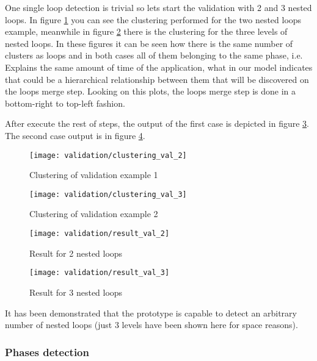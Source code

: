 One single loop detection is trivial so lets start the validation with 2 and 3 nested
loops. In figure \ref{fig:clustering_val_2} you can see the clustering performed
for the two nested loops example, meanwhile in figure
\ref{fig:clustering_val_3} there is the clustering for the three levels of
nested loops. In these figures it can be seen how there is the
same number of clusters as loops and in both cases all of them belonging to the
same phase, i.e. Explains the same amount of time of the application, what in our
model indicates that could be a hierarchical relationship between them that will
be discovered on the loops merge step. Looking on this plots, the loops merge
step is done in a bottom-right to top-left fashion.

After execute the rest of steps, the output of the first case is depicted in figure 
\ref{fig:result_val_2}. The second case output is in figure \ref{fig:result_val_3}. 

\begin{multicols}{2}
  \begin{figure}[H]
    \centering
    \texttt{[image: validation/clustering\_val\_2]}
    \caption{Clustering of validation example 1}
    \label{fig:clustering_val_2}
  \end{figure}
  \columnbreak
  \begin{figure}[H]
    \centering
    \texttt{[image: validation/clustering\_val\_3]}
    \caption{Clustering of validation example 2}
    \label{fig:clustering_val_3}
  \end{figure}
\end{multicols}

\begin{figure}[H]
    \centering
    \texttt{[image: validation/result\_val\_2]}
    \caption{Result for 2 nested loops}
    \label{fig:result_val_2}
\end{figure}
\begin{figure}[H]
    \centering
    \texttt{[image: validation/result\_val\_3]}
    \caption{Result for 3 nested loops}
    \label{fig:result_val_3}
\end{figure}

It has been demonstrated that the prototype is capable to detect an arbitrary
number of nested loops (just 3 levels have been shown here for space reasons).

\subsubsection{Phases detection}

